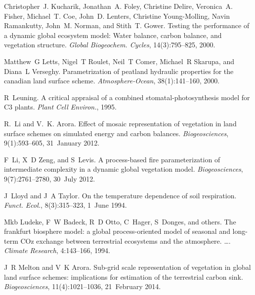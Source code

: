 \begin{DoxyDescription}
\item[\label{_CITEREF_Kucharik2000-xk}%
\mbox{[}32\mbox{]}]Christopher~J. Kucharik, Jonathan~A. Foley, Christine Delire, Veronica~A. Fisher, Michael~T. Coe, John~D. Lenters, Christine Young-\/\+Molling, Navin Ramankutty, John~M. Norman, and Stith~T. Gower. Testing the performance of a dynamic global ecosystem model\+: Water balance, carbon balance, and vegetation structure. {\itshape Global Biogeochem. Cycles}, 14(3)\+:795--825, 2000. 


\item[\label{_CITEREF_Letts2000-pg}%
\mbox{[}33\mbox{]}]Matthew~G Letts, Nigel~T Roulet, Neil~T Comer, Michael~R Skarupa, and Diana~L Verseghy. Parametrization of peatland hydraulic properties for the canadian land surface scheme. {\itshape Atmosphere-\/\+Ocean}, 38(1)\+:141--160, 2000. 


\item[\label{_CITEREF_Leuning1995-ab}%
\mbox{[}34\mbox{]}]R~Leuning. A critical appraisal of a combined stomatal-\/photosynthesis model for C3 plants. {\itshape Plant Cell Environ.}, 1995.


\item[\label{_CITEREF_Li2012-f7f}%
\mbox{[}35\mbox{]}]R.~Li and V.~K. Arora. Effect of mosaic representation of vegetation in land surface schemes on simulated energy and carbon balances. {\itshape Biogeosciences}, 9(1)\+:593--605, 31~January 2012. 


\item[\label{_CITEREF_Li20121c2}%
\mbox{[}36\mbox{]}]F~Li, X~D Zeng, and S~Levis. A process-\/based fire parameterization of intermediate complexity in a dynamic global vegetation model. {\itshape Biogeosciences}, 9(7)\+:2761--2780, 30~July 2012. 


\item[\label{_CITEREF_Lloyd1994-ct}%
\mbox{[}37\mbox{]}]J~Lloyd and J~A Taylor. On the temperature dependence of soil respiration. {\itshape Funct. Ecol.}, 8(3)\+:315--323, 1~June 1994. 


\item[\label{_CITEREF_Ludeke1994-px}%
\mbox{[}38\mbox{]}]Mkb Ludeke, F~W Badeck, R~D Otto, C~Hager, S~Donges, and others. The frankfurt biosphere model\+: a global process-\/oriented model of seasonal and long-\/term C\+Oz exchange between terrestrial ecosystems and the atmosphere. …. {\itshape Climate Research}, 4\+:143--166, 1994.


\item[\label{_CITEREF_Melton2014-xk}%
\mbox{[}39\mbox{]}]J~R Melton and V~K Arora. Sub-\/grid scale representation of vegetation in global land surface schemes\+: implications for estimation of the terrestrial carbon sink. {\itshape Biogeosciences}, 11(4)\+:1021--1036, 21~February 2014. 



\end{DoxyDescription}
